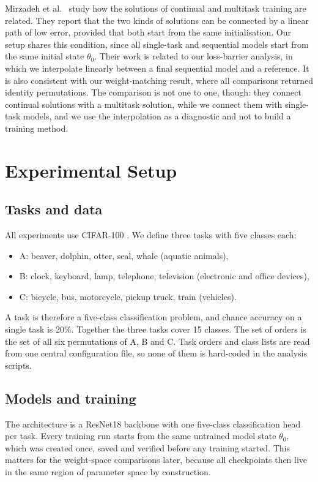 \documentclass[11pt,a4paper]{article}
\newcommand{\task}[1]{\textsf{#1}}
\begin{document}
Mirzadeh et al.\ \cite{mirzadeh2020} study how the solutions of continual and multitask training are related. They report that the two kinds of solutions can be connected by a linear path of low error, provided that both start from the same initialisation. Our setup shares this condition, since all single-task and sequential models start from the same initial state $\theta_0$. Their work is related to our loss-barrier analysis, in which we interpolate linearly between a final sequential model and a reference. It is also consistent with our weight-matching result, where all comparisons returned identity permutations. The comparison is not one to one, though: they connect continual solutions with a multitask solution, while we connect them with single-task models, and we use the interpolation as a diagnostic and not to build a training method.

\section{Experimental Setup}\label{sec:setup}

\subsection{Tasks and data}

All experiments use CIFAR-100 \cite{krizhevsky2009}. We define three tasks with five classes each:
\begin{itemize}
  \item \task{A}: beaver, dolphin, otter, seal, whale (aquatic animals),
  \item \task{B}: clock, keyboard, lamp, telephone, television (electronic and office devices),
  \item \task{C}: bicycle, bus, motorcycle, pickup truck, train (vehicles).
\end{itemize}
A task is therefore a five-class classification problem, and chance accuracy on a single task is 20\%. Together the three tasks cover 15 classes. The set of orders is the set of all six permutations of \task{A}, \task{B} and \task{C}. Task orders and class lists are read from one central configuration file, so none of them is hard-coded in the analysis scripts.

\subsection{Models and training}

The architecture is a ResNet18 backbone \cite{he2016} with one five-class classification head per task. Every training run starts from the same untrained model state $\theta_0$, which was created once, saved and verified before any training started. This matters for the weight-space comparisons later, because all checkpoints then live in the same region of parameter space by construction.
\end{document}
